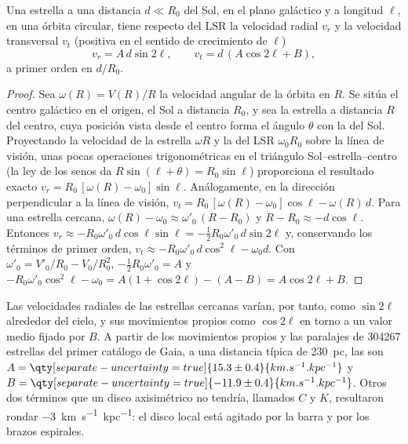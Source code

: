 \begin{theorem}\label{thm:b3:milky-way-galaxies:oort}
Una estrella a una distancia $d \ll R_0$ del Sol, en el plano galáctico y a
longitud $\ell$, en una órbita circular, tiene respecto del LSR la velocidad
radial $v_r$ y la velocidad transversal $v_t$ (positiva en el sentido de
crecimiento de $\ell$)
\[
v_r = A\,d\sin 2\ell, \qquad v_t = d\,(A\cos 2\ell + B),
\]
a primer orden en $d/R_0$.
\end{theorem}

\begin{proof}
Sea $\omega(R) = V(R)/R$ la velocidad angular de la órbita en $R$. Se sitúa
el centro galáctico en el origen, el Sol a distancia $R_0$, y sea la
estrella a distancia $R$ del centro, cuya posición vista desde el
centro forma el ángulo $\theta$ con la del Sol. Proyectando la velocidad de la
estrella $\omega R$ y la del LSR $\omega_0 R_0$ sobre la línea de
visión, unas pocas operaciones trigonométricas en el triángulo Sol--estrella--centro (la ley de los
senos da $R\sin(\ell + \theta) = R_0\sin\ell$) proporciona el resultado exacto
$v_r = R_0\,[\omega(R) - \omega_0]\sin\ell$. Análogamente, en la dirección
perpendicular a la línea de visión,
$v_t = R_0\,[\omega(R) - \omega_0]\cos\ell - \omega(R)\,d$. Para una
estrella cercana, $\omega(R) - \omega_0 \approx \omega'_0\,(R - R_0)$ y
$R - R_0 \approx -d\cos\ell$. Entonces
$v_r \approx -R_0\omega'_0\,d\cos\ell\sin\ell = -\tfrac12 R_0\omega'_0\,
d\sin 2\ell$ y, conservando los términos de primer orden,
$v_t \approx -R_0\omega'_0\,d\cos^2\ell - \omega_0 d$. Con
$\omega'_0 = V'_0/R_0 - V_0/R_0^2$, $-\tfrac12 R_0\omega'_0 = A$ y
$-R_0\omega'_0\cos^2\ell - \omega_0 = A(1 + \cos 2\ell) - (A - B) =
A\cos 2\ell + B$.
\end{proof}

Las velocidades radiales de las estrellas cercanas varían, por tanto, como $\sin 2\ell$ alrededor del
cielo, y sus movimientos propios como $\cos 2\ell$ en torno a un valor medio fijado por $B$.
A partir de los movimientos propios y las paralajes de \num{304267} estrellas del primer
catálogo de Gaia, a una distancia típica de \qty{230}{pc}, las 
son $A = \qty[separate-uncertainty=true]{15.3 \pm 0.4}{km.s^{-1}.kpc^{-1}}$
y $B = \qty[separate-uncertainty=true]{-11.9 \pm 0.4}{km.s^{-1}.kpc^{-1}}$.
Otros dos términos que un disco axisimétrico no tendría, llamados $C$
y $K$, resultaron rondar \qty{-3}{km.s^{-1}.kpc^{-1}}: el disco local está
agitado por la barra y por los brazos espirales.

